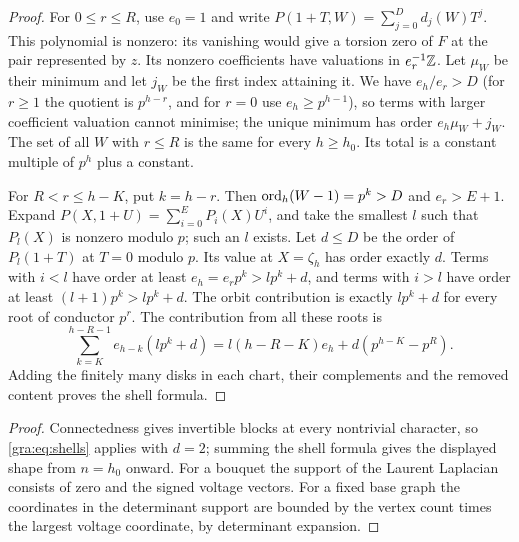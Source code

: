 \begin{proof}
For $0\le r\le R$, use $e_0=1$ and write
$P(1+T,W)=\sum_{j=0}^Dd_j(W)T^j$. This polynomial is nonzero: its
vanishing would give a torsion zero of $F$ at the pair represented by
$z$. Its nonzero coefficients have valuations in $e_r^{-1}\mathbb{Z}$. Let
$\mu_W$ be their minimum and let $j_W$ be the first index attaining it. We
have $e_h/e_r>D$ (for $r\ge1$ the quotient is $p^{h-r}$, and for $r=0$ use
$e_h\ge p^{h-1}$), so terms with larger coefficient valuation cannot
minimise; the unique minimum has order $e_h\mu_W+j_W$. The set of all $W$
with $r\le R$ is the same for every $h\ge h_0$. Its total is a constant
multiple of $p^h$ plus a constant.

For $R<r\le h-K$, put $k=h-r$. Then $\operatorname{ord}_h(W-1)=p^k>D$ and $e_r>E+1$.
Expand $P(X,1+U)=\sum_{i=0}^EP_i(X)U^i$, and take the smallest $l$ such
that $P_l(X)$ is nonzero modulo $p$; such an $l$ exists. Let $d\le D$ be
the order of $P_l(1+T)$ at $T=0$ modulo $p$. Its value at $X=\zeta_h$ has
order exactly $d$. Terms with $i<l$ have order at least
$e_h=e_rp^k>lp^k+d$, and terms with $i>l$ have order at least
$(l+1)p^k>lp^k+d$. The orbit contribution is exactly $lp^k+d$ for every
root of conductor $p^r$. The contribution from all these roots is
\[
 \sum_{k=K}^{h-R-1}e_{h-k}(lp^k+d)=l(h-R-K)e_h+d(p^{h-K}-p^R).
\]
Adding the finitely many disks in each chart, their complements and the
removed content proves the shell formula.
\end{proof}


\begin{proof}
Connectedness gives invertible blocks at every nontrivial character, so
\eqref{gra:eq:shells} applies with $d=2$; summing the shell formula gives
the displayed shape from $n=h_0$ onward. For a bouquet the support of the
Laurent Laplacian consists of zero and the signed voltage vectors. For a
fixed base graph the coordinates in the determinant support are bounded by
the vertex count times the largest voltage coordinate, by determinant
expansion.
\end{proof}

